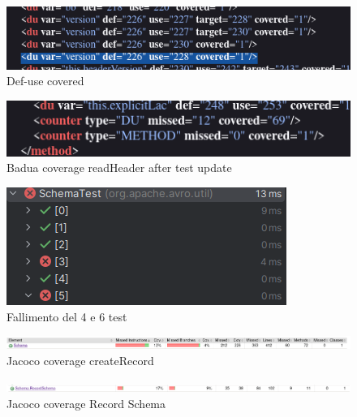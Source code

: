 \documentclass[12pt, a4paper]{article}
\begin{document}
  \begin{figure}
    \includegraphics[width=\linewidth]{./images/file_info/BaduaCoverageReadHeader3.png}
    \caption{Def-use covered}
    \label{fig:BaduaCoverageReadHeader3}
  \end{figure}

  \begin{figure}
    \includegraphics[width=\linewidth]{./images/file_info/BaduaCoverageReadHeader4.png}
    \caption{Badua coverage readHeader after test update}
    \label{fig:BaduaCoverageReadHeader4}
  \end{figure}

  \begin{figure}
    \includegraphics[width=\linewidth]{./images/create_record/TestFailsCreateRecord.png}
    \caption{Fallimento del 4 e 6 test}
    \label{fig:TestFailsCreateRecord}
  \end{figure}

  \begin{figure}
    \includegraphics[width=\linewidth]{./images/create_record/JacocoCoverage1.png}
    \caption{Jacoco coverage createRecord}
    \label{fig:JacocoCoverageCreateRecord1}
  \end{figure}

  \begin{figure}
    \includegraphics[width=\linewidth]{./images/create_record/JacocoCoverage2.png}
    \caption{Jacoco coverage Record Schema}
    \label{fig:JacocoCoverageCreateRecord2}
  \end{figure}
\end{document}
